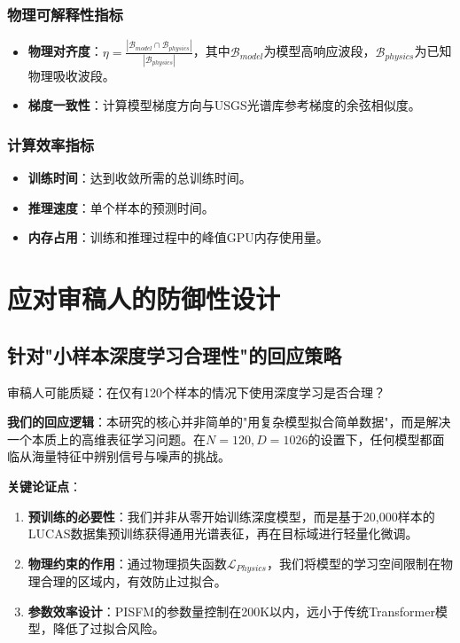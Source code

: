 \documentclass[12pt, a4paper]{article}
\begin{document}
\subsubsection{物理可解释性指标}
\begin{itemize}
    \item \textbf{物理对齐度}：$\eta = \frac{|\mathcal{B}_{model} \cap \mathcal{B}_{physics}|}{|\mathcal{B}_{physics}|}$，其中$\mathcal{B}_{model}$为模型高响应波段，$\mathcal{B}_{physics}$为已知物理吸收波段。
    \item \textbf{梯度一致性}：计算模型梯度方向与USGS光谱库参考梯度的余弦相似度。
\end{itemize}

\subsubsection{计算效率指标}
\begin{itemize}
    \item \textbf{训练时间}：达到收敛所需的总训练时间。
    \item \textbf{推理速度}：单个样本的预测时间。
    \item \textbf{内存占用}：训练和推理过程中的峰值GPU内存使用量。
\end{itemize}

\newpage
\section{应对审稿人的防御性设计}

\subsection{针对"小样本深度学习合理性"的回应策略}
审稿人可能质疑：在仅有120个样本的情况下使用深度学习是否合理？

\textbf{我们的回应逻辑}：本研究的核心并非简单的"用复杂模型拟合简单数据"，而是解决一个本质上的高维表征学习问题。在$N=120, D=1026$的设置下，任何模型都面临从海量特征中辨别信号与噪声的挑战。

\textbf{关键论证点}：
\begin{enumerate}
    \item \textbf{预训练的必要性}：我们并非从零开始训练深度模型，而是基于20,000样本的LUCAS数据集预训练获得通用光谱表征，再在目标域进行轻量化微调。
    \item \textbf{物理约束的作用}：通过物理损失函数$\mathcal{L}_{Physics}$，我们将模型的学习空间限制在物理合理的区域内，有效防止过拟合。
    \item \textbf{参数效率设计}：PISFM的参数量控制在200K以内，远小于传统Transformer模型，降低了过拟合风险。
\end{enumerate}
\end{document}
